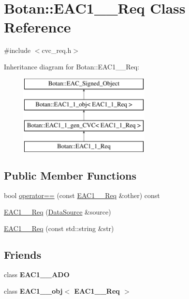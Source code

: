 \hypertarget{classBotan_1_1EAC1__1__Req}{\section{Botan\-:\-:E\-A\-C1\-\_\-\_\-\-Req Class Reference}
\label{classBotan_1_1EAC1__1__Req}
}


{\ttfamily \#include $<$cvc\-\_\-req.\-h$>$}

Inheritance diagram for Botan\-:\-:E\-A\-C1\-\_\-\_\-\-Req\-:\begin{figure}[H]
\begin{center}
\leavevmode
\includegraphics[height=4.000000cm]{classBotan_1_1EAC1__1__Req}
\end{center}
\end{figure}
\subsection*{Public Member Functions}
\begin{DoxyCompactItemize}
\item 
bool \hyperlink{classBotan_1_1EAC1__1__Req_a60bf58fcc011bfa35dffe67a6b71330e}{operator==} (const \hyperlink{classBotan_1_1EAC1__1__Req}{E\-A\-C1\-\_\-\_\-\-Req} \&other) const 
\item 
\hyperlink{classBotan_1_1EAC1__1__Req_a772e70702a4d312c91012382b26ca0dd}{E\-A\-C1\-\_\-\_\-\-Req} (\hyperlink{classBotan_1_1DataSource}{Data\-Source} \&source)
\item 
\hyperlink{classBotan_1_1EAC1__1__Req_ad56ecca23d637025029b449fc93bde87}{E\-A\-C1\-\_\-\_\-\-Req} (const std\-::string \&str)
\end{DoxyCompactItemize}
\subsection*{Friends}
\begin{DoxyCompactItemize}
\item 
\hypertarget{classBotan_1_1EAC1__1__Req_a73cdf66b3403650089b1b7852cf729e0}{class {\bfseries E\-A\-C1\-\_\-\_\-\-A\-D\-O}}\label{classBotan_1_1EAC1__1__Req_a73cdf66b3403650089b1b7852cf729e0}

\item 
\hypertarget{classBotan_1_1EAC1__1__Req_a6011e073848c48df11bfb46b32b02d1f}{class {\bfseries E\-A\-C1\-\_\-\_\-obj$<$ E\-A\-C1\-\_\-\_\-\-Req $>$}}\label{classBotan_1_1EAC1__1__Req_a6011e073848c48df11bfb46b32b02d1f}

\end{DoxyCompactItemize}
